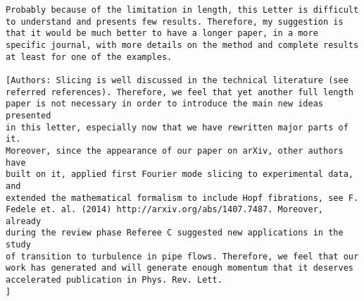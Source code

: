 {\begin{verbatim}
Probably because of the limitation in length, this Letter is difficult
to understand and presents few results. Therefore, my suggestion is
that it would be much better to have a longer paper, in a more
specific journal, with more details on the method and complete results
at least for one of the examples.

[Authors: Slicing is well discussed in the technical literature (see
referred references). Therefore, we feel that yet another full length
paper is not necessary in order to introduce the main new ideas presented
in this letter, especially now that we have rewritten major parts of it.
Moreover, since the appearance of our paper on arXiv, other authors have
built on it, applied first Fourier mode slicing to experimental data, and
extended the mathematical formalism to include Hopf fibrations, see F.
Fedele et. al. (2014) http://arxiv.org/abs/1407.7487. Moreover, already
during the review phase Referee C suggested new applications in the study
of transition to turbulence in pipe flows. Therefore, we feel that our
work has generated and will generate enough momentum that it deserves
accelerated publication in Phys. Rev. Lett.
]
\end{verbatim}
} %

